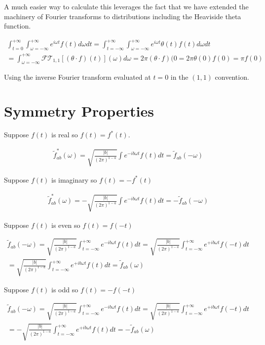 \documentclass[12pt]{article}
\begin{document}
A much easier way to calculate this leverages the fact that we have extended the machinery of Fourier transforms to distributions including the Heaviside theta function.

\begin{align}
\int_{t=0}^{+\infty} \int_{\omega=-\infty}^{+\infty} e^{i \omega t} f(t) d\omega dt = \int_{t=-\infty}^{+\infty} \int_{\omega=-\infty}^{+\infty} e^{i \omega t} \theta(t) f(t) d\omega dt\\
= \int_{\omega=-\infty}^{+\infty} \mathcal{FT}_{1,1}[(\theta \cdot f)(t)](\omega) d\omega = 2\pi (\theta\cdot f)(0 = 2\pi \theta(0)f(0) = \pi f(0)
\end{align}

Using the inverse Fourier transform evaluated at $t=0$ in the $(1,1)$ convention.

\section{Symmetry Properties}
Suppose $f(t)$ is real so $f(t)=f^*(t)$.

\begin{align}
\tilde{f}_{ab}^*(\omega) = \sqrt{\frac{|b|}{(2\pi)^{1-a}}}\int e^{-ib\omega t} f(t) dt = \tilde{f}_{ab}(-\omega)
\end{align}

Suppose $f(t)$ is imaginary so $f(t) = -f^*(t)$

\begin{align}
\tilde{f}_{ab}^*(\omega) = -\sqrt{\frac{|b|}{(2\pi)^{1-a}}}\int e^{-ib\omega t} f(t) dt = -\tilde{f}_{ab}(-\omega)
\end{align}

Suppose $f(t)$ is even so $f(t) = f(-t)$

\begin{align}
\tilde{f}_{ab}(-\omega) = \sqrt{\frac{|b|}{(2\pi)^{1-a}}}\int_{t=-\infty}^{+\infty} e^{-ib\omega t} f(t) dt 
= \sqrt{\frac{|b|}{(2\pi)^{1-a}}}\int_{t=-\infty}^{+\infty} e^{+ib\omega t} f(-t) dt \\
= \sqrt{\frac{|b|}{(2\pi)^{1-a}}}\int_{t=-\infty}^{+\infty} e^{+ib\omega t} f(t) dt   = \tilde{f}_{ab}(\omega)
\end{align}

Suppose $f(t)$ is odd so $f(t) = -f(-t)$

\begin{align}
\tilde{f}_{ab}(-\omega) = \sqrt{\frac{|b|}{(2\pi)^{1-a}}}\int_{t=-\infty}^{+\infty} e^{-ib\omega t} f(t) dt 
= \sqrt{\frac{|b|}{(2\pi)^{1-a}}}\int_{t=-\infty}^{+\infty} e^{+ib\omega t} f(-t) dt \\
= -\sqrt{\frac{|b|}{(2\pi)^{1-a}}}\int_{t=-\infty}^{+\infty} e^{+ib\omega t} f(t) dt   = -\tilde{f}_{ab}(\omega)
\end{align}
\end{document}
